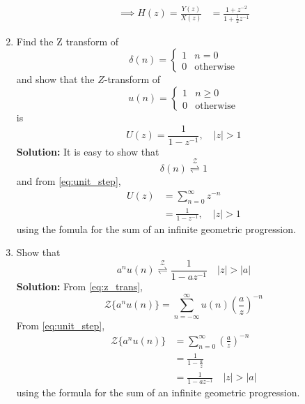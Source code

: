 \documentclass[journal,12pt,twocolumn]{IEEEtran}
\newcommand{\solution}{\noindent \textbf{Solution: }}
\providecommand{\brak}[1]{\ensuremath{\left(#1\right)}}
\providecommand{\abs}[1]{\left\vert#1\right\vert}
\providecommand{\ztrans}{\overset{\mathcal{Z}}{ \rightleftharpoons}}
\numberwithin{equation}{section}
\renewcommand\thesection{\arabic{section}}
\begin{document}
\begin{enumerate}[label=\thesection.\arabic*]
\begin{align}
\implies H\brak{z} = \frac{Y(z)}{X(z)} &= \frac{1 + z^{-2}}{1 + \frac{1}{2}z^{-1}}
\label{eq:freq_resp}
\end{align}
%
\item Find the Z transform of 
\begin{equation}
\delta(n)
=
\begin{cases}
1 & n = 0
\\
0 & \text{otherwise}
\end{cases}
\end{equation}
and show that the $Z$-transform of
\begin{equation}
\label{eq:unit_step}
u(n)
=
\begin{cases}
1 & n \ge 0
\\
0 & \text{otherwise}
\end{cases}
\end{equation}
is
\begin{equation}
U(z) = \frac{1}{1-z^{-1}}, \quad \abs{z} > 1
\end{equation}
\solution It is easy to show that
\begin{equation}
\delta(n) \ztrans 1
\end{equation}
and from \eqref{eq:unit_step},
\begin{align}
U(z) &= \sum _{n= 0}^{\infty}z^{-n}
\\
&=\frac{1}{1-z^{-1}}, \quad \abs{z} > 1
\end{align}
using the fomula for the sum of an infinite geometric progression.
%
\item Show that 
\begin{equation}
\label{eq:anun}
a^nu(n) \ztrans \frac{1}{1-az^{-1}} \quad \abs{z} > \abs{a}
\end{equation}
\solution From \eqref{eq:z_trans},
\begin{equation}
{\mathcal {Z}}\{a^nu(n)\} = \sum _{n= -\infty}^{\infty}u(n)\brak{\frac{a}{z}}^{-n}
\end{equation}
From \eqref{eq:unit_step},
\begin{align}
{\mathcal {Z}}\{a^nu(n)\} &= \sum _{n= 0}^{\infty}\brak{\frac{a}{z}}^{-n}\\
&= \frac{1}{1-\frac{a}{z}}\\
&= \frac{1}{1-az^{-1}} \quad \abs{z} > \abs{a}
\end{align}
using the formula for the sum of an infinite geometric progression.


\end{enumerate}
\end{document}
